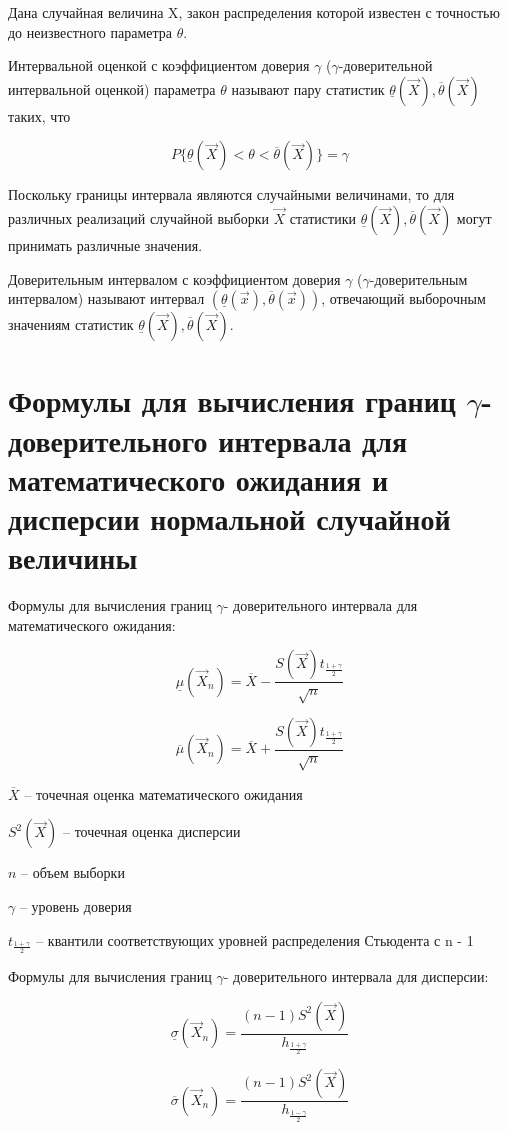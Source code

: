 \documentclass[a4paper,oneside,12pt]{extreport}
\theoremstyle{indented}
\begin{document}
\hfill 

Дана случайная величина X, закон распределения которой известен с точностью до неизвестного параметра $\theta$. 

Интервальной оценкой с коэффициентом доверия $\gamma$ ($\gamma$-доверительной интервальной оценкой) параметра $\theta$ называют пару статистик $\underline{\theta}(\vec X), \overline{\theta}(\vec X)$ таких, что

$$P\{\underline{\theta}(\vec X)< \theta< \overline{\theta}(\vec X)\}=\gamma$$ 


Поскольку границы интервала являются случайными величинами, то для различных реализаций случайной выборки $\vec X$ статистики $\underline{\theta}(\vec X), \overline{\theta}(\vec X)$ могут принимать различные значения.

Доверительным интервалом с коэффициентом доверия $\gamma$ ($\gamma$-доверительным интервалом) называют интервал $(\underline{\theta}(\vec x), \overline{\theta}(\vec x))$, отвечающий выборочным значениям статистик $\underline{\theta}(\vec X), \overline{\theta}(\vec X)$. 

\section{Формулы для вычисления границ $\gamma$- доверительного интервала для математического ожидания и дисперсии нормальной случайной величины}

Формулы для вычисления границ $\gamma$- доверительного интервала для математического ожидания:

$$
\underline\mu(\vec X_n)=\overline X - \frac{S(\vec X)t_{\frac{1+\gamma}{2}}}{\sqrt{n}}
$$

$$
\overline\mu(\vec X_n)=\overline X + \frac{S(\vec X)t_{\frac{1+\gamma}{2}}}{\sqrt{n}}
$$

$\overline X$ -- точечная оценка математического ожидания

$S^2(\vec X)$ -- точечная оценка дисперсии

$n$ -- объем выборки

$\gamma$ -- уровень доверия

$t_{\frac{1+\gamma}{2}}$ -- квантили соответствующих уровней распределения Стьюдента с n - 1

Формулы для вычисления границ $\gamma$- доверительного интервала для дисперсии:

$$
\underline\sigma(\vec X_n)= \frac{(n-1)S^2(\vec X)}{h_{\frac{1+\gamma}{2}}}
$$

$$
\overline\sigma(\vec X_n)= \frac{(n-1)S^2(\vec X)}{h_{\frac{1-\gamma}{2}}}
$$
\end{document}
